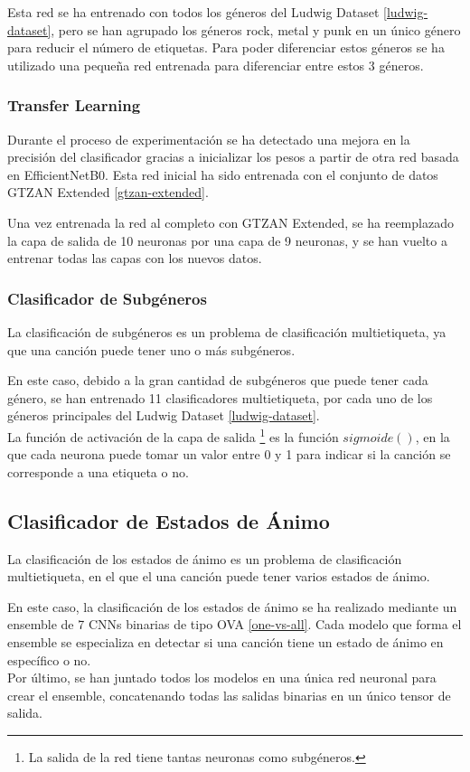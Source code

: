 Esta red se ha entrenado con todos los géneros del Ludwig Dataset \ref{ludwig-dataset}, pero se han agrupado los géneros rock, metal y punk en un único género para reducir el número de etiquetas. Para poder diferenciar estos géneros se ha utilizado una pequeña red entrenada para diferenciar entre estos 3 géneros. 

\subsubsection{Transfer Learning}
Durante el proceso de experimentación se ha detectado una mejora en la precisión del clasificador gracias a inicializar los pesos a partir de otra red basada en EfficientNetB0. Esta red inicial ha sido entrenada con el conjunto de datos GTZAN Extended \ref{gtzan-extended}.

Una vez entrenada la red al completo con GTZAN Extended, se ha reemplazado la capa de salida de 10 neuronas por una capa de 9 neuronas, y se han vuelto a entrenar todas las capas con los nuevos datos.

\subsubsection{Clasificador de Subgéneros}
La clasificación de subgéneros es un problema de clasificación multietiqueta, ya que una canción puede tener uno o más subgéneros.

En este caso, debido a la gran cantidad de subgéneros que puede tener cada género, 
se han entrenado 11 clasificadores multietiqueta, por cada uno de los géneros principales del Ludwig Dataset \ref{ludwig-dataset}.\\
La función de activación de la capa de salida \footnote{La salida de la red tiene tantas neuronas como subgéneros.} es la función $sigmoide()$, en la que cada neurona puede tomar un valor entre 0 y 1 para indicar si la canción se corresponde a una etiqueta o no.

\subsection{Clasificador de Estados de Ánimo} \label{mood_ensemble}
La clasificación de los estados de ánimo es un problema de clasificación multietiqueta, en el que el una canción puede tener varios estados de ánimo. 

En este caso, la clasificación de los estados de ánimo se ha realizado mediante un ensemble de 7 CNNs binarias de tipo OVA \ref{one-vs-all}. Cada modelo que forma el ensemble se especializa en detectar si una canción tiene un estado de ánimo en específico o no. \\
Por último, se han juntado todos los modelos en una única red neuronal para crear el ensemble, concatenando todas las salidas binarias en un único tensor de salida. 


